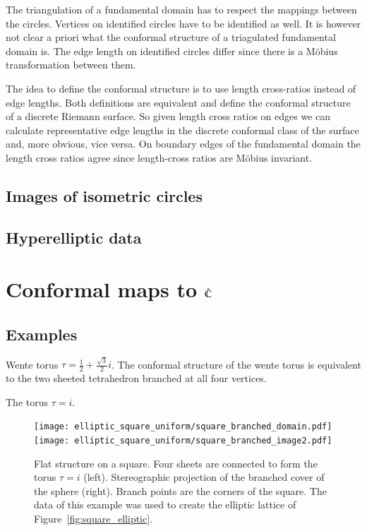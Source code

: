 \documentclass[Thesis.tex]{subfiles}
\begin{document}
The triangulation of a fundamental domain has to respect the mappings between the circles. Vertices on identified 
circles have to be identified as well. It is however not clear a priori what the conformal structure of a triagulated 
fundamental domain is. The edge length on identified circles differ since there is a M{\" o}bius transformation 
between them. 

The idea to define the conformal structure is to use length cross-ratios instead of edge lengths. Both definitions are equivalent and define the conformal structure of a discrete Riemann surface. So given length cross ratios on edges we can calculate representative edge lengths in the discrete conformal class of the surface and, more obvious, vice versa. On boundary edges of the fundamental domain the length cross ratios agree since length-cross ratios are M{\" o}bius invariant.




\subsection{Images of isometric circles}
\subsection{Hyperelliptic data}

\section{Conformal maps to $\hat{\mathbb C}$}



\subsection{Examples}

\begin{example}
\label{ex:wente_branched}
Wente torus $\tau=\frac{1}{2}+\frac{\sqrt 3}{2}i$. The conformal structure of the wente torus is equivalent to the two sheeted tetrahedron branched at all four vertices.
\end{example}

\begin{example}
\label{ex:square_branched}
The torus $\tau=i$.
\end{example}

\begin{figure}
\centering
\texttt{[image: elliptic\_square\_uniform/square\_branched\_domain.pdf]}
\texttt{[image: elliptic\_square\_uniform/square\_branched\_image2.pdf]}
\caption{Flat structure on a square. Four sheets are connected to form the torus $\tau=i$ (left).
Stereographic projection of the branched cover of the sphere (right). Branch points are the corners 
of the square. The data of this example was used to create the elliptic lattice of
Figure~\ref{fig:square_elliptic}.}
\label{fig:square_branched}
\end{figure}
\end{document}
